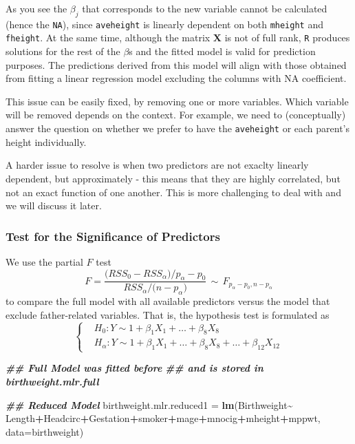 \documentclass[
]{book}
\newenvironment{Shaded}{\begin{snugshade}}{\end{snugshade}}
\newcommand{\AttributeTok}[1]{\textcolor[rgb]{0.13,0.29,0.53}{#1}}
\newcommand{\DocumentationTok}[1]{\textcolor[rgb]{0.56,0.35,0.01}{\textbf{\textit{#1}}}}
\newcommand{\FunctionTok}[1]{\textcolor[rgb]{0.13,0.29,0.53}{\textbf{#1}}}
\newcommand{\NormalTok}[1]{#1}
\newcommand{\OtherTok}[1]{\textcolor[rgb]{0.56,0.35,0.01}{#1}}
\newcommand{\SpecialCharTok}[1]{\textcolor[rgb]{0.81,0.36,0.00}{\textbf{#1}}}
\begin{document}
As you see the \(\beta_j\) that corresponds to the new variable cannot be calculated (hence the \texttt{NA}), since \texttt{aveheight} is linearly dependent on both \texttt{mheight} and \texttt{fheight}. At the same time, although the matrix \(\mathbf{X}\) is not of full rank, \texttt{R} produces solutions for the rest of the \(\beta\)s and the fitted model is valid for prediction purposes. The predictions derived from this model will align with those obtained from fitting a linear regression model excluding the columns with NA coefficient.

This issue can be easily fixed, by removing one or more variables. Which variable will be removed depends on the context. For example, we need to (conceptually) answer the question on whether we prefer to have the \texttt{aveheight} or each parent's height individually.

A harder issue to resolve is when two predictors are not exaclty linearly dependent, but approximately - this means that they are highly correlated, but not an exact function of one another. This is more challenging to deal with and we will discuss it later.

\subsubsection{Test for the Significance of Predictors}\label{test-for-the-significance-of-predictors}

We use the partial \(F\) test
\[F=\frac{\bigl(RSS_0 - RSS_{\alpha}\bigr)/p_{\alpha} - p_0}{RSS_{\alpha}/ \bigl(n-p_{\alpha} \bigr)}\,  \sim \, F_{p_{\alpha} - p_0, n-p_{\alpha}}\]
to compare the full model with all available predictors versus the model that exclude father-related variables. That is, the hypothesis test is formulated as
\[\begin{cases}
 &H_0: Y \sim  1+  \beta_{1} X_{1} + \ldots + \beta_{8}X_{8} \\
 & H_{\alpha}:  Y \sim  1+  \beta_1 X_1 + \ldots + \beta_{8}X_{8}+ \ldots + \beta_{12} X_{12} 
 \end{cases} 
 \]

\begin{Shaded}
\begin{Highlighting}[]
\DocumentationTok{\#\# Full Model was fitted before }
\DocumentationTok{\#\# and is stored in birthweight.mlr.full}

\DocumentationTok{\#\# Reduced Model }
\NormalTok{birthweight.mlr.reduced1 }\OtherTok{=} \FunctionTok{lm}\NormalTok{(Birthweight}\SpecialCharTok{\textasciitilde{}}\NormalTok{ Length}\SpecialCharTok{+}\NormalTok{Headcirc}\SpecialCharTok{+}\NormalTok{Gestation}\SpecialCharTok{+}\NormalTok{smoker}\SpecialCharTok{+}\NormalTok{mage}\SpecialCharTok{+}\NormalTok{mnocig}\SpecialCharTok{+}\NormalTok{mheight}\SpecialCharTok{+}\NormalTok{mppwt,  }\AttributeTok{data=}\NormalTok{birthweight)}
\end{Highlighting}
\end{Shaded}
\end{document}
